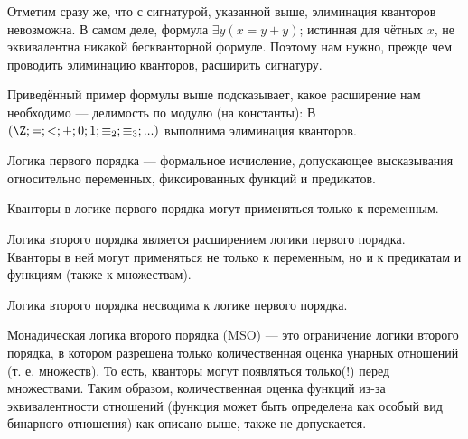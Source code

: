     
    \begin{Rem}
        Отметим сразу же, что с сигнатурой, указанной выше, элиминация кванторов невозможна. В самом деле, формула $\exists y (x = y + y)$; истинная для чётных $x$, не эквивалентна никакой бескванторной формуле. Поэтому нам нужно, прежде чем проводить элиминацию кванторов, расширить сигнатуру.
    \end{Rem}
    
    
    \begin{Thm}
        Приведённый пример формулы выше подсказывает, какое расширение нам необходимо --- делимость по модулю (на константы): В $(\Z; =; <; +; 0; 1; \equiv_2; \equiv_3; ...)$ выполнима элиминация кванторов.
    \end{Thm}

    
    
    \begin{Def}
        Логика первого порядка --- формальное исчисление, допускающее высказывания относительно переменных, фиксированных функций и предикатов.
    \end{Def}
    
    \begin{Rem}
        Кванторы в логике первого порядка могут применяться только к переменным.
    \end{Rem}
    
    \begin{Def}
        Логика второго порядка является расширением логики первого порядка. Кванторы в ней могут применяться не только к переменным, но и к предикатам и функциям (также к множествам).
    \end{Def}
    
    \begin{Rem}
        Логика второго порядка несводима к логике первого порядка.
    \end{Rem}
    
    \begin{Def}
        Монадическая логика второго порядка (MSO) — это ограничение логики второго порядка, в котором разрешена только количественная оценка унарных отношений (т. е. множеств). То есть, кванторы могут появляться только(!) перед множествами. Таким образом, количественная оценка функций из-за эквивалентности отношений (функция может быть определена как особый вид бинарного отношения) как описано выше, также не допускается.
    \end{Def}

